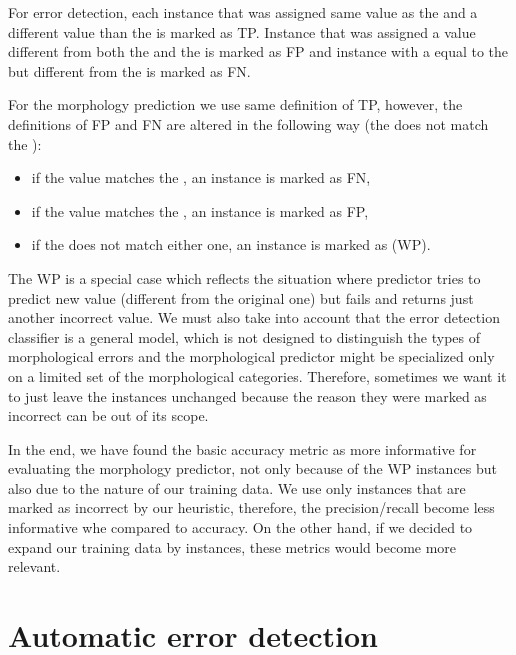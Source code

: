 
For error detection, each instance that was assigned same value as the 
and a different value than the  is marked as TP. Instance
that was assigned a value different from both the  and the 
is marked as FP and instance with a  equal to the 
but different from the  is marked as FN.

For the morphology prediction we use same definition of TP, however, the definitions
of FP and FN are altered in the following way (the 
does not match the ):
\begin{itemize}
\item if the  value matches the , an instance is marked as FN,
\item if the  value matches the , an instance is marked as FP,
\item if the  does not match either one, an instance is marked as  (WP).
\end{itemize}

The WP is a special case which reflects the situation where predictor tries to predict new value (different
from the original one) but fails and returns just another incorrect value. We must also take into account
that the error detection classifier is a general model, which is not designed to distinguish
the types of morphological errors and the morphological predictor might be specialized only on a limited
set of the morphological categories. Therefore, sometimes we want it to just leave the 
instances unchanged because the reason they were marked as incorrect can be out of its scope.

In the end, we have found the basic accuracy metric as more informative for evaluating the morphology predictor,
not only because of the WP instances but also due to the nature of our training data. We use only instances
that are marked as incorrect by our heuristic, therefore,
the precision/recall become less informative whe compared to accuracy.
On the other hand, if we decided to expand our training data
by  instances, these metrics would become more relevant. 

\section{Automatic error detection}

